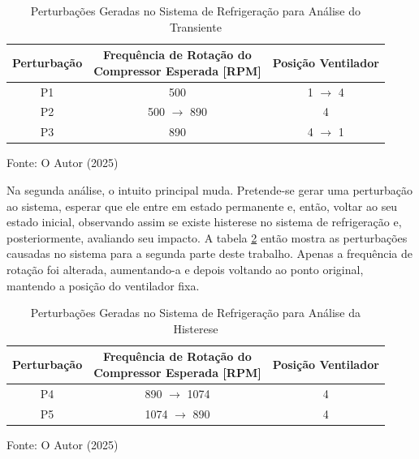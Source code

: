 \begin{table}[htb]
    \centering
    \begin{tabular}{|c|c|c|}
        \hline
        \textbf{Perturbação} & \makecell{\textbf{Frequência de Rotação do} \\ \textbf{Compressor Esperada [RPM]}} & \textbf{Posição Ventilador} \\
        \hline
        P1 & 500 & 1 $\rightarrow$ 4  \\
        P2 & 500 $\rightarrow$ 890 & 4  \\
        P3 & 890 & 4 $\rightarrow$ 1  \\
        \hline
    \end{tabular}
    \caption{Perturbações Geradas no Sistema de Refrigeração para Análise do Transiente}
    \vspace{5pt} 
{\footnotesize Fonte: O Autor (2025) }
    \label{tab:pertubaçõesTransiente}
\end{table}

Na segunda análise, o intuito principal muda. Pretende-se gerar uma perturbação ao sistema, esperar que ele entre em estado permanente e, então, voltar ao seu estado inicial, observando assim se existe histerese no sistema de refrigeração e, posteriormente, avaliando seu impacto. A tabela \ref{tab:pertubaçõesHisterese} então mostra as perturbações causadas no sistema para a segunda parte deste trabalho. Apenas a frequência de rotação foi alterada, aumentando-a e depois voltando ao ponto original, mantendo a posição do ventilador fixa.
\\
\begin{table}[h]
    \centering
    \begin{tabular}{|c|c|c|}
        \hline
        \textbf{Perturbação} & \makecell{\textbf{Frequência de Rotação do} \\ \textbf{Compressor Esperada [RPM]}} & \textbf{Posição Ventilador} \\
        \hline
        P4 & 890 $\rightarrow$ 1074 & 4  \\
        P5 & 1074 $\rightarrow$ 890 & 4  \\
        \hline
    \end{tabular}
    \caption{Perturbações Geradas no Sistema de Refrigeração para Análise da Histerese}
    
    \vspace{5pt} 
    {\footnotesize Fonte: O Autor (2025)}
    \label{tab:pertubaçõesHisterese}
\end{table}

